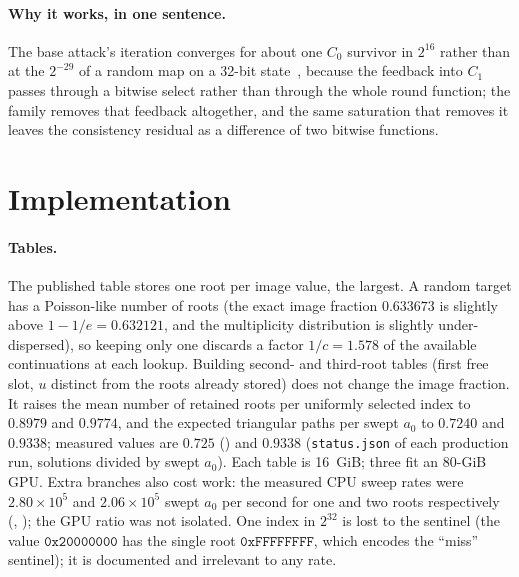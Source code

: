 \documentclass[11pt,a4paper]{article}
\newcommand{\hex}[1]{\texttt{#1}}
\begin{document}
\paragraph{Why it works, in one sentence.}
The base attack's iteration converges for about one $C_0$ survivor in
$2^{16}$ rather than at the $2^{-29}$ of a random map on a 32-bit
state~\cite{Basra2026R20}, because the feedback into $C_1$ passes through a
bitwise select rather than through the whole round function; the family
removes that feedback altogether, and the same saturation that removes it
leaves the consistency residual as a difference of two bitwise functions.

\section{Implementation}
\label{sec:impl}

\paragraph{Tables.}
The published table stores one root per image value, the largest.  A random
target has a Poisson-like number of roots (the exact image fraction
$0.633673$ is slightly above $1-1/e=0.632121$, and the multiplicity
distribution is slightly under-dispersed), so keeping only one discards a
factor $1/c=1.578$ of the available continuations at each lookup.  Building
second- and third-root tables (first free slot, $u$ distinct from the roots
already stored) does not change the image fraction.  It raises the mean number
of retained roots per uniformly selected index to $0.8979$ and $0.9774$, and
the expected triangular paths per swept $a_0$ to $0.7240$ and $0.9338$;
measured values are $0.725$ () and $0.9338$
(\texttt{status.json} of each production run, solutions divided by swept
$a_0$).  Each table is 16~GiB; three fit an 80-GiB GPU.  Extra branches also
cost work: the measured CPU sweep rates were $2.80\times10^{5}$ and
$2.06\times10^{5}$ swept $a_0$ per second for one and two roots respectively
(, ); the GPU ratio
was not isolated.  One index in $2^{32}$ is lost to the sentinel
(the value $\hex{0x20000000}$ has the single root $\hex{0xFFFFFFFF}$, which
encodes the ``miss'' sentinel); it is documented and irrelevant to any rate.
\end{document}
